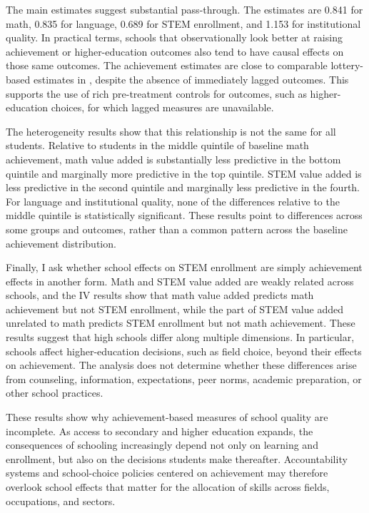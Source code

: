 \documentclass[a4paper, article, english, oneside, unknownkeysallowed, 12pt]{memoir}
\begin{document}
The main estimates suggest substantial pass-through.
The estimates are 0.841 for math, 0.835 for language, 0.689 for STEM enrollment, and 1.153 for institutional quality.
In practical terms, schools that observationally look better at raising achievement or higher-education outcomes also tend to have causal effects on those same outcomes.
The achievement estimates are close to comparable lottery-based estimates in \textcite{angrist_leveraging_2017}, despite the absence of immediately lagged outcomes.
This supports the use of rich pre-treatment controls for outcomes, such as higher-education choices, for which lagged measures are unavailable.

The heterogeneity results show that this relationship is not the same for all students.
Relative to students in the middle quintile of baseline math achievement, math value added is substantially less predictive in the bottom quintile and marginally more predictive in the top quintile.
STEM value added is less predictive in the second quintile and marginally less predictive in the fourth.
For language and institutional quality, none of the differences relative to the middle quintile is statistically significant.
These results point to differences across some groups and outcomes, rather than a common pattern across the baseline achievement distribution.

Finally, I ask whether school effects on STEM enrollment are simply achievement effects in another form.
Math and STEM value added are weakly related across schools, and the IV results show that math value added predicts math achievement but not STEM enrollment, while the part of STEM value added unrelated to math predicts STEM enrollment but not math achievement.
These results suggest that high schools differ along multiple dimensions.
In particular, schools affect higher-education decisions, such as field choice, beyond their effects on achievement.
The analysis does not determine whether these differences arise from counseling, information, expectations, peer norms, academic preparation, or other school practices.

These results show why achievement-based measures of school quality are incomplete.
As access to secondary and higher education expands, the consequences of schooling increasingly depend not only on learning and enrollment, but also on the decisions students make thereafter.
Accountability systems and school-choice policies centered on achievement may therefore overlook school effects that matter for the allocation of skills across fields, occupations, and sectors.
\end{document}
